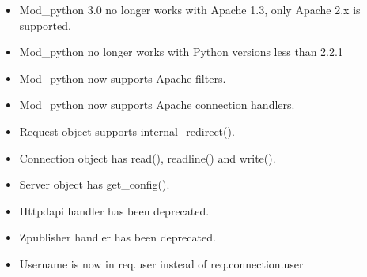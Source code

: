   \begin{itemize}

    \item
      Mod_python 3.0 no longer works with Apache 1.3, only Apache 2.x is
      supported.
    \item
      Mod_python no longer works with Python versions less than 2.2.1
    \item 
      Mod_python now supports Apache filters.
    \item 
      Mod_python now supports Apache connection handlers.
    \item 
      Request object supports internal_redirect().
    \item
      Connection object has read(), readline() and write().
    \item
      Server object has get_config().
    \item
       
      Httpdapi handler has been deprecated.
    \item
      Zpublisher handler has been deprecated.
    \item
      Username is now in req.user instead of req.connection.user
  \end{itemize}
